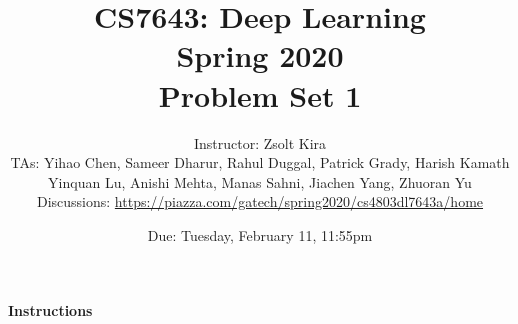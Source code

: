 \documentclass[11pt,english]{article}
\begin{document}
\title{CS7643: Deep Learning\\
Spring 2020 \\
Problem Set 1}
\author{Instructor: Zsolt Kira \\
  TAs: Yihao Chen, Sameer Dharur, Rahul Duggal, Patrick Grady, Harish Kamath \\
  Yinquan Lu, Anishi Mehta, Manas Sahni, Jiachen Yang, Zhuoran Yu \\
Discussions: \url{https://piazza.com/gatech/spring2020/cs4803dl7643a/home}}
\date{Due: Tuesday, February 11, 11:55pm}

\maketitle


\paragraph*{Instructions}
\end{document}
